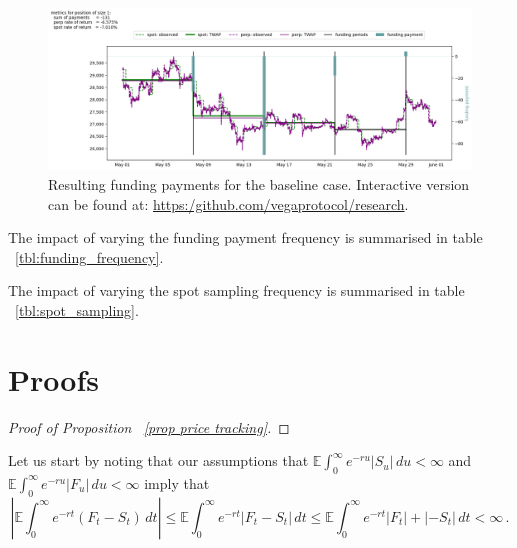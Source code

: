 \documentclass[10pt]{article}
\begin{document}
\begin{figure}[h]
    \centering
    \includegraphics[width=\textwidth]{./plots/7d-payment-frequency_8h-spot-sampling-300s_perp-sampling.png}
    \caption{Resulting funding payments for the baseline case. Interactive version can be found at: \href{https:/github.com/vegaprotocol/research}{https:/github.com/vegaprotocol/research}.}
    \label{fig:resulting_funding_periods}
\end{figure}

The impact of varying the funding payment frequency is summarised in table ~\ref{tbl:funding_frequency}.



The impact of varying the spot sampling frequency is summarised in table ~\ref{tbl:spot_sampling}.



\appendix
\section{Proofs}
\begin{proof}[Proof of Proposition ~\ref{prop price tracking}]
	
\end{proof}

Let us start by noting that our assumptions that $\mathbb E\int_0^\infty e^{-ru} |S_u|\,du < \infty$ and $\mathbb E\int_0^\infty e^{-ru} |F_u|\,du < \infty$ imply that 
\[
\left|\mathbb E \int_0^\infty e^{-rt}(F_t-S_t)\,dt\right| \leq \mathbb E \int_0^\infty e^{-rt}\left|F_t-S_t\right|\,dt \leq \mathbb E \int_0^\infty e^{-rt}|F_t|+|-S_t|\,dt < \infty\,.
\]
\end{document}
